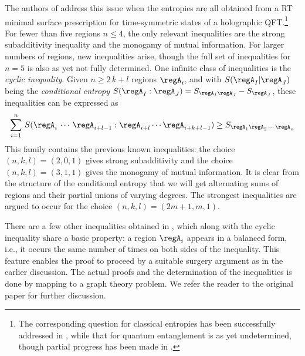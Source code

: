\documentclass[12pt,openany]{book}
\begin{document}
 The authors of \cite{Bao:2015bfa} address this issue when the entropies are all obtained from a RT minimal surface prescription for time-symmetric states of a holographic QFT.\footnote{ The corresponding question for classical entropies has been successfully addressed in \cite{Zhang:1998aa,Matus:2007aa}, while that for quantum entanglement is as yet undetermined, though partial progress has been made in \cite{Cadney:2012aa,Linden:2013aa}. } For fewer than five regions $n \leq 4$, the only relevant inequalities are the strong subadditivity inequality and the monogamy of mutual information. For larger numbers of regions, new inequalities arise, though the full set of inequalities for $n=5$ is also as yet not fully determined. One infinite class of inequalities is the {\em cyclic inequality}. Given $n \geq 2\,k+l$ regions $\regA_i$, and with $S(\regA_I|\regA_J)$ being the {\em conditional entropy} $S(\regA_I:\regA_J) = S_{\regA_I \regA_J} - S_{\regA_J} $, these inequalities can be expressed as
\begin{equation}
\sum_{i=1}^n\, S(\regA_i \,\cdots\, \regA_{i+l-1}: \regA_{i+l} \cdots \regA_{i+k+l-1}) \geq S_{\regA_1 \regA_2\, \cdots\, \regA_n}
\label{}
\end{equation}
%
This family contains the previous known inequalities: the choice $(n,k,l) = (2,0,1) $ gives strong subadditivity and the choice $(n,k,l) = (3,1,1)$ gives the monogamy of mutual information. It is clear from the structure of the conditional entropy that we will get alternating sums of regions and their partial unions of varying degrees. The strongest inequalities are argued to occur for the choice $(n,k,l) = (2m+1, m,1)$.

There are a few other inequalities obtained in \cite{Bao:2015bfa}, which along with the cyclic inequality share a basic property: a region $\regA_i$ appears in a balanced form, i.e., it occurs the same number of times on both sides of the inequality. This feature enables the proof to proceed by a suitable surgery argument as in the earlier discussion. The actual proofs and the determination of the inequalities is done by mapping to a graph theory problem. We refer the reader to the original paper for further discussion.
\end{document}
